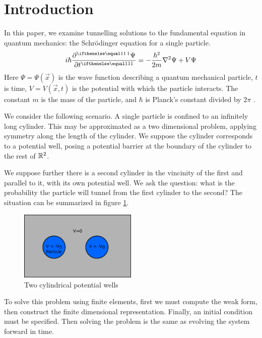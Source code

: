 \documentclass[../../main.tex]{subfiles}
\begin{document}
\section{Introduction}

In this paper, we examine tunnelling solutions to the 
fundamental equation in quantum mechanics: the Schr\"odinger equation
for a single particle.
\begin{equation}
		\label{eq:schrodinger}
		i \hbar \pder{\Psi}{t} = -\frac{\hbar^2}{2m} \nabla^2 \Psi + 
		V \Psi
\end{equation}
Here $\Psi = \Psi(\vec x)$ is the wave function describing a 
quantum mechanical particle, $t$ is time, 
$V = V(\vec x, t)$ is the potential with which the particle 
interacts.  The constant $m$ is the mass of the particle,
and $\hbar$ is Planck's constant divided by $2\pi$ 
\cite{griffiths-quantum}.  

We consider the following scenario. 
A single particle is confined to an infinitely long cylinder.
This may be approximated as a two dimensional problem,
applying symmetry along the length of the cylinder.
We suppose the cylinder corresponds to a potential well,
posing a potential barrier at the boundary of the cylinder to
the rest of $\mathbb{R}^2$.  

We suppose further there is a second cylinder in the 
vincinity of the first and parallel to it, with its own potential well.
We ask the question: what is the probability the particle will 
tunnel from the first cylinder to the second?
The situation can be summarized in figure \ref{fig:system-sketch}.

\begin{figure}[h]
		\centering
		\includegraphics[width=0.5\textwidth]{system-sketch.png}
		\caption{Two cylindrical potential wells}
		\label{fig:system-sketch}
\end{figure}

To solve this problem using finite elements, first we must compute the weak 
form, then construct the finite dimensional representation.  
Finally, an initial condition must be specified.  
Then solving the problem is the same as evolving the system
forward in time.  
\end{document}
